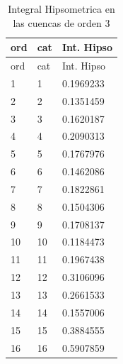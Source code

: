 \documentclass[11pt,]{article}
\begin{document}
\begin{longtable}[]{@{}lll@{}}
\caption{\label{tablanueve}Integral Hipsometrica en las cuencas de orden
3}\tabularnewline
\toprule
ord & cat & Int. Hipso\tabularnewline
\midrule
\endfirsthead
\toprule
ord & cat & Int. Hipso\tabularnewline
\midrule
\endhead
1 & 1 & 0.1969233\tabularnewline
2 & 2 & 0.1351459\tabularnewline
3 & 3 & 0.1620187\tabularnewline
4 & 4 & 0.2090313\tabularnewline
5 & 5 & 0.1767976\tabularnewline
6 & 6 & 0.1462086\tabularnewline
7 & 7 & 0.1822861\tabularnewline
8 & 8 & 0.1504306\tabularnewline
9 & 9 & 0.1708137\tabularnewline
10 & 10 & 0.1184473\tabularnewline
11 & 11 & 0.1967438\tabularnewline
12 & 12 & 0.3106096\tabularnewline
13 & 13 & 0.2661533\tabularnewline
14 & 14 & 0.1557006\tabularnewline
15 & 15 & 0.3884555\tabularnewline
16 & 16 & 0.5907859\tabularnewline
\bottomrule
\end{longtable}
\end{document}
